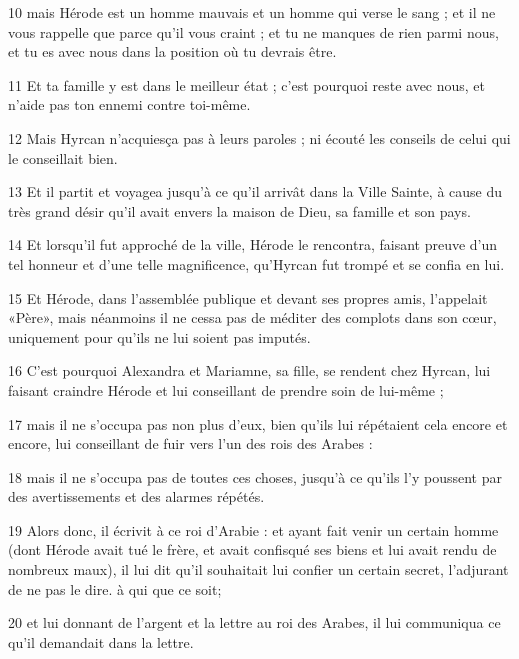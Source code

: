 \par 10 mais Hérode est un homme mauvais et un homme qui verse le sang ; et il ne vous rappelle que parce qu'il vous craint ; et tu ne manques de rien parmi nous, et tu es avec nous dans la position où tu devrais être.

\par 11 Et ta famille y est dans le meilleur état ; c'est pourquoi reste avec nous, et n'aide pas ton ennemi contre toi-même.

\par 12 Mais Hyrcan n'acquiesça pas à leurs paroles ; ni écouté les conseils de celui qui le conseillait bien.

\par 13 Et il partit et voyagea jusqu'à ce qu'il arrivât dans la Ville Sainte, à cause du très grand désir qu'il avait envers la maison de Dieu, sa famille et son pays.

\par 14 Et lorsqu'il fut approché de la ville, Hérode le rencontra, faisant preuve d'un tel honneur et d'une telle magnificence, qu'Hyrcan fut trompé et se confia en lui.

\par 15 Et Hérode, dans l'assemblée publique et devant ses propres amis, l'appelait «Père», mais néanmoins il ne cessa pas de méditer des complots dans son cœur, uniquement pour qu'ils ne lui soient pas imputés.

\par 16 C'est pourquoi Alexandra et Mariamne, sa fille, se rendent chez Hyrcan, lui faisant craindre Hérode et lui conseillant de prendre soin de lui-même ;

\par 17 mais il ne s'occupa pas non plus d'eux, bien qu'ils lui répétaient cela encore et encore, lui conseillant de fuir vers l'un des rois des Arabes :

\par 18 mais il ne s'occupa pas de toutes ces choses, jusqu'à ce qu'ils l'y poussent par des avertissements et des alarmes répétés.

\par 19 Alors donc, il écrivit à ce roi d'Arabie : et ayant fait venir un certain homme (dont Hérode avait tué le frère, et avait confisqué ses biens et lui avait rendu de nombreux maux), il lui dit qu'il souhaitait lui confier un certain secret, l'adjurant de ne pas le dire. à qui que ce soit;

\par 20 et lui donnant de l'argent et la lettre au roi des Arabes, il lui communiqua ce qu'il demandait dans la lettre.

